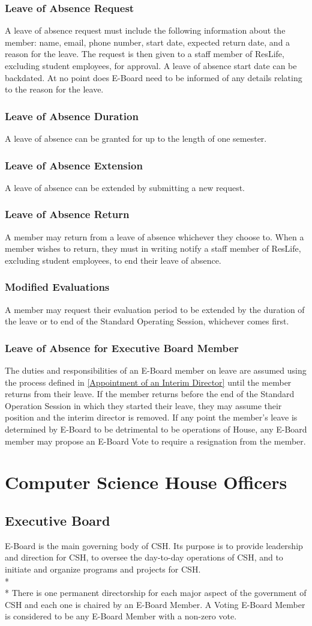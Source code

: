 \documentclass{article}
\newcommand{\article}[1]{\section{#1} \label{#1}}
\newcommand{\asection}[1]{\subsection{#1} \label{#1}}
\newcommand{\asubsection}[1]{\subsubsection{#1} \label{#1}}
\begin{document}
\asubsection{Leave of Absence Request}
A leave of absence request must include the following information about the member: name, email, phone number, start date, expected return date, and a reason for the leave.
The request is then given to a staff member of ResLife, excluding student employees, for approval.
A leave of absence start date can be backdated.
At no point does E-Board need to be informed of any details relating to the reason for the leave.

\asubsection{Leave of Absence Duration}
A leave of absence can be granted for up to the length of one semester.

\asubsection{Leave of Absence Extension}
A leave of absence can be extended by submitting a new request.

\asubsection{Leave of Absence Return}
A member may return from a leave of absence whichever they choose to.
When a member wishes to return, they must in writing notify a staff member of ResLife, excluding student employees, to end their leave of absence.

\asubsection{Modified Evaluations}
A member may request their evaluation period to be extended by the duration of the leave or to end of the Standard Operating Session, whichever comes first.

\asubsection{Leave of Absence for Executive Board Member}
The duties and responsibilities of an E-Board member on leave are assumed using the process defined in \ref{Appointment of an Interim Director} until the member returns from their leave.
If the member returns before the end of the Standard Operation Session in which they started their leave, they may assume their position and the interim director is removed. %
If any point the member's leave is determined by E-Board to be detrimental to be operations of House, any E-Board member may propose an E-Board Vote to require a resignation from the member.

\article{Computer Science House Officers}

\asection{Executive Board}
E-Board is the main governing body of CSH.
Its purpose is to provide leadership and direction for CSH, to oversee the day-to-day operations of CSH, and to initiate and organize programs and projects for CSH.
\\*\\*
There is one permanent directorship for each major aspect of the government of CSH and each one is chaired by an E-Board Member.
A Voting E-Board Member is considered to be any E-Board Member with a non-zero vote. %
\end{document}
